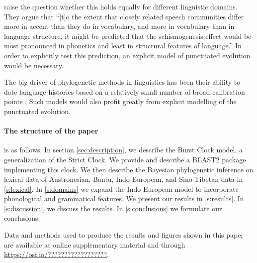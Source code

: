 \documentclass[a4paper,12pt]{scrartcl}
\begin{document}

\Textcite{gray2013three} raise the question whether this holds equally for
different linguistic domains. They argue that “[t]o the extent that closely
related speech communities differ more in accent than they do in vocabulary, and
more in vocabulary than in language structure, it might be predicted that the
schismogenesis effect would be most pronounced in phonetics and least in
structural features of language.” In order to explicitly test this prediction,
an explicit model of punctuated evolution would be necessary.

The big driver of phylogenetic methods in linguistics has been their ability to
date language histories based on a relatively small number of broad calibration
points \parencite{}. Such models would also profit greatly from explicit
modelling of the punctuated evolution.

\paragraph{The structure of the paper} is as follows. In section
\cref{sec:description}, we describe the Burst Clock model, a generalization of
the Strict Clock. We provide and describe a BEAST2 \parencite{beast2} package
implementing this clock. We then describe the Bayesian phylogenetic inference on
lexical data of Austronesian, Bantu, Indo-European, and Sino-Tibetan data in
\cref{s:lexical}. In \cref{s:domains} we expand the Indo-European model to
incorporate phonological and grammatical features. We present our results in
\cref{s:results}. In \cref{s:discussion}, we discuss the results. In
\cref{s:conclusions} we formulate our conclusions.

Data and methods used to produce the results and figures shown in this paper are
available as online supplementary material and through
\url{https://osf.io/??????????????????}.
\end{document}
